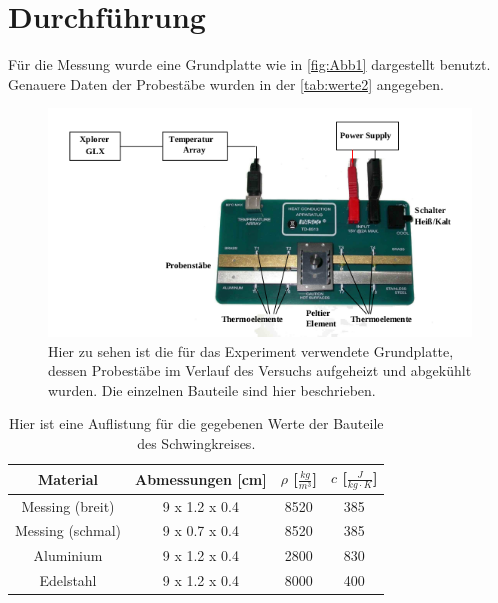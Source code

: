\section{Durchführung}
\label{sec:Durchführung}

Für die Messung wurde eine Grundplatte wie in \autoref{fig:Abb1} dargestellt benutzt. Genauere Daten der Probestäbe wurden in der \autoref{tab:werte2} angegeben.

\begin{figure}
    \centering
    \includegraphics[scale=0.7]{content/Bilder/Aufbau.png}
    \caption{Hier zu sehen ist die für das Experiment verwendete Grundplatte, dessen Probestäbe im Verlauf des Versuchs aufgeheizt und abgekühlt wurden. Die einzelnen Bauteile sind hier beschrieben.}
    \label{fig:Abb1}
\end{figure}

\begin{table}
    \centering
    \caption{Hier ist eine Auflistung für die gegebenen Werte der Bauteile des Schwingkreises.}
    \label{tab:werte2}
    \begin{tabular}{c|c|c|c}
        Material & Abmessungen [cm] & $\rho$ [$\frac{kg}{m^3}$] & $c$ [$\frac{J}{kg\cdot K}$]\\
        \midrule
        Messing (breit) & 9 x 1.2 x 0.4 & 8520 & 385\\
        Messing (schmal) & 9 x 0.7 x 0.4 & 8520 & 385\\
        Aluminium & 9 x 1.2 x 0.4 & 2800 & 830\\
        Edelstahl & 9 x 1.2 x 0.4 & 8000 & 400\\
    \end{tabular}
  \end{table}

